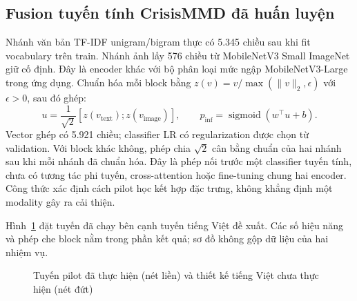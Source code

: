 \subsection{Fusion tuyến tính CrisisMMD đã huấn luyện}
Nhánh văn bản TF-IDF unigram/bigram thực có 5.345 chiều sau khi fit vocabulary trên train. Nhánh ảnh lấy 576 chiều từ MobileNetV3 Small ImageNet giữ cố định. Đây là encoder khác với bộ phân loại mức ngập MobileNetV3-Large trong ứng dụng. Chuẩn hóa mỗi block bằng $z(v)=v/\max(\lVert v\rVert_2,\epsilon)$ với $\epsilon>0$, sau đó ghép:
\begin{equation}
 u=\frac{1}{\sqrt{2}}[z(v_{\mathrm{text}});z(v_{\mathrm{image}})],\qquad
 p_{\mathrm{inf}}=\operatorname{sigmoid}(w^\top u+b).
 \label{eq:pilot-fusion}
\end{equation}
Vector ghép có 5.921 chiều; classifier LR có regularization được chọn từ validation. Với block khác không, phép chia $\sqrt{2}$ cân bằng chuẩn của hai nhánh sau khi mỗi nhánh đã chuẩn hóa. Đây là phép nối trước một classifier tuyến tính, chưa có tương tác phi tuyến, cross-attention hoặc fine-tuning chung hai encoder. Công thức xác định cách pilot học kết hợp đặc trưng, không khẳng định một modality gây ra cải thiện.

Hình~\ref{fig:multimodal-levels} đặt tuyến đã chạy bên cạnh tuyến tiếng Việt đề xuất. Các số hiệu năng và phép che block nằm trong phần kết quả; sơ đồ không gộp dữ liệu của hai nhiệm vụ.
\begin{figure}[htbp]\centering
{}
\caption{Tuyến pilot đã thực hiện (nét liền) và thiết kế tiếng Việt chưa thực hiện (nét đứt)}
\label{fig:multimodal-levels}
\end{figure}

